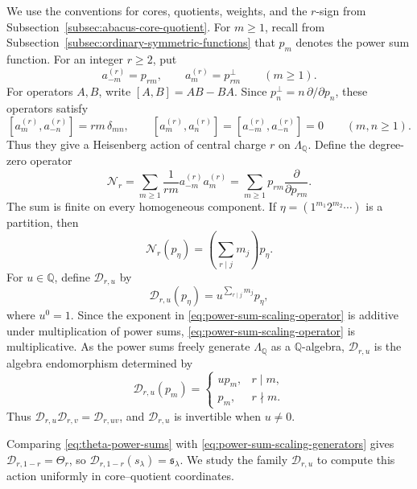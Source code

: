 \documentclass[12pt,reqno,a4paper]{amsart}
\numberwithin{equation}{section}
\numberwithin{figure}{section}
\theoremstyle{plain}
\theoremstyle{definition}
\begin{document}
We use the conventions for cores, quotients, weights, and the $r$-sign
from Subsection~\ref{subsec:abacus-core-quotient}.
For $m\geq1$, recall from
Subsection~\ref{subsec:ordinary-symmetric-functions} that $p_m$ denotes
the power sum function. For an integer $r\geq2$, put
\[
 a_{-m}^{(r)}=p_{rm},
 \qquad
 a_m^{(r)}=p_{rm}^{\perp}
 \qquad(m\geq1).
\]
For operators $A,B$, write $[A,B]=AB-BA$.
Since $p_n^{\perp}=n\,\partial/\partial p_n$, these operators satisfy
\begin{equation}\label{eq:heisenberg-relations}
 [a_m^{(r)},a_{-n}^{(r)}]=rm\,\delta_{mn},
 \qquad
 [a_m^{(r)},a_n^{(r)}]=[a_{-m}^{(r)},a_{-n}^{(r)}]=0
 \qquad(m,n\geq1).
\end{equation}
Thus they give a Heisenberg action of central charge $r$ on
$\Lambda_{\mathbb Q}$.  Define the degree-zero operator
\begin{equation}\label{eq:divisible-power-sum-counting-operator}
\mathcal N_r
=\sum_{m\geq1}\frac{1}{rm}a_{-m}^{(r)}a_m^{(r)}
=\sum_{m\geq1}p_{rm}\frac{\partial}{\partial p_{rm}}.
\end{equation}
The sum is finite on every homogeneous component.  If
$\eta=(1^{m_1}2^{m_2}\cdots)$ is a partition, then
\begin{equation}\label{eq:number-operator-eigenvalue}
\mathcal N_r(p_\eta)=\left(\sum_{r\mid j}m_j\right)p_\eta.
\end{equation}
For $u\in\mathbb Q$, define $\mathcal D_{r,u}$ by
\begin{equation}\label{eq:power-sum-scaling-operator}
\mathcal D_{r,u}(p_\eta)=u^{\sum_{r\mid j}m_j}p_\eta,
\end{equation}
where $u^0=1$.  Since the exponent in
\eqref{eq:power-sum-scaling-operator} is additive under multiplication
of power sums, \eqref{eq:power-sum-scaling-operator} is multiplicative.
As the power sums freely generate
$\Lambda_{\mathbb Q}$ as a $\mathbb Q$-algebra,
$\mathcal D_{r,u}$ is the algebra endomorphism determined by
\begin{equation}\label{eq:power-sum-scaling-generators}
\mathcal D_{r,u}(p_m)=
\begin{cases}
u p_m,&r\mid m,\\
p_m,&r\nmid m.
\end{cases}
\end{equation}
Thus $\mathcal D_{r,u}\mathcal D_{r,v}=\mathcal D_{r,uv}$, and
$\mathcal D_{r,u}$ is invertible when $u\neq0$.

Comparing \eqref{eq:theta-power-sums} with
\eqref{eq:power-sum-scaling-generators} gives
$\mathcal D_{r,1-r}=\Theta_r$, so
$\mathcal D_{r,1-r}(s_\lambda)=\mathfrak s_\lambda$.
We study the family $\mathcal D_{r,u}$ to compute this action
uniformly in core--quotient coordinates.
\end{document}
